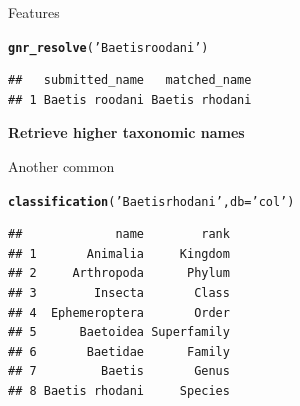 \documentclass[final,t]{beamer}\usepackage[]{graphicx}\usepackage[]{color}
\makeatletter
\newcommand{\hlstr}[1]{\textcolor[rgb]{0.192,0.494,0.8}{#1}}%
\newcommand{\hlstd}[1]{\textcolor[rgb]{0.345,0.345,0.345}{#1}}%
\newcommand{\hlkwc}[1]{\textcolor[rgb]{0.333,0.667,0.333}{#1}}%
\newcommand{\hlkwd}[1]{\textcolor[rgb]{0.737,0.353,0.396}{\textbf{#1}}}%
\newenvironment{kframe}{%
 \def\at@end@of@kframe{}%
 \ifinner\ifhmode%
  \def\at@end@of@kframe{\end{minipage}}%
  \begin{minipage}{\columnwidth}%
 \fi\fi%
 \def\FrameCommand##1{\hskip\@totalleftmargin \hskip-\fboxsep
 \colorbox{shadecolor}{##1}\hskip-\fboxsep
     \hskip-\linewidth \hskip-\@totalleftmargin \hskip\columnwidth}%
 \MakeFramed {\advance\hsize-\width
   \@totalleftmargin\z@ \linewidth\hsize
   \@setminipage}}%
 {\par\unskip\endMakeFramed%
 \at@end@of@kframe}
\newenvironment{knitrout}{}{} %
\renewenvironment{knitrout}{\begin{footnotesize}}{\end{footnotesize}}
\makeatother
\begin{document}
\begin{frame}[fragile]
\begin{columns}[t]
\begin{column}{.49\linewidth}
\begin{block}{Features}
\begin{knitrout}\footnotesize
{}\color{fgcolor}\begin{kframe}
\begin{alltt}
\hlkwd{gnr_resolve}\hlstd{(}\hlstr{'Baetis roodani'}\hlstd{)}
\end{alltt}
\end{kframe}
\end{knitrout}
\begin{knitrout}\footnotesize
{}\color{fgcolor}\begin{kframe}
\begin{verbatim}
##   submitted_name   matched_name
## 1 Baetis roodani Baetis rhodani
\end{verbatim}
\end{kframe}
\end{knitrout}

					
\textcolor{i6bluedark}{\textbf{Retrieve higher taxonomic names}} 
        \vspace{0.5em}
        \par
        \begingroup
        \leftskip=2cm
        \noindent 
          Another common 
        \par
        \endgroup

\begin{knitrout}\footnotesize
{}\color{fgcolor}\begin{kframe}
\begin{alltt}
\hlkwd{classification}\hlstd{(}\hlstr{'Baetis rhodani'}\hlstd{,} \hlkwc{db}\hlstd{=}\hlstr{'col'}\hlstd{)}
\end{alltt}
\end{kframe}
\end{knitrout}
\begin{knitrout}\footnotesize
{}\color{fgcolor}\begin{kframe}
\begin{verbatim}
##             name        rank
## 1       Animalia     Kingdom
## 2     Arthropoda      Phylum
## 3        Insecta       Class
## 4  Ephemeroptera       Order
## 5      Baetoidea Superfamily
## 6       Baetidae      Family
## 7         Baetis       Genus
## 8 Baetis rhodani     Species
\end{verbatim}
\end{kframe}
\end{knitrout}



\end{block}
\end{column}
\end{columns}
\end{frame}
\end{document}
